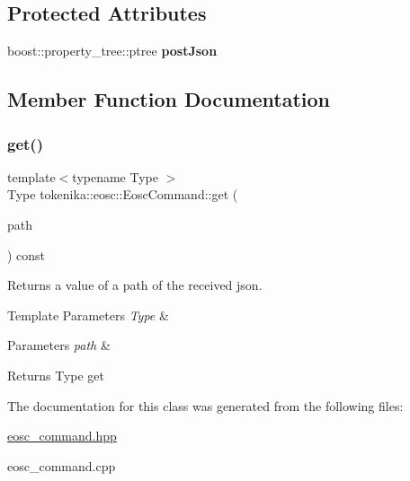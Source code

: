 \subsection*{Protected Attributes}
\begin{DoxyCompactItemize}
\item 
\mbox{\label{classtokenika_1_1eosc_1_1_eosc_command_a1642782c91f4877a8fba395324fb7337}} 
boost\+::property\+\_\+tree\+::ptree {\bfseries post\+Json}
\end{DoxyCompactItemize}


\subsection{Member Function Documentation}
\mbox{\label{classtokenika_1_1eosc_1_1_eosc_command_aa1da6eb23f52159afa4a15e767cd7d6f}} 
\subsubsection{\texorpdfstring{get()}{get()}}
{\footnotesize\ttfamily template$<$typename Type $>$ \\
Type tokenika\+::eosc\+::\+Eosc\+Command\+::get (\begin{DoxyParamCaption}\item[{const boost\+::property\+\_\+tree\+::ptree\+::path\+\_\+type \&}]{path }\end{DoxyParamCaption}) const\hspace{0.3cm}{\ttfamily [inline]}}



Returns a value of a path of the received json. 


\begin{DoxyTemplParams}{Template Parameters}
{\em Type} & \\
\hline
\end{DoxyTemplParams}

\begin{DoxyParams}{Parameters}
{\em path} & \\
\hline
\end{DoxyParams}
\begin{DoxyReturn}{Returns}
Type get 
\end{DoxyReturn}


The documentation for this class was generated from the following files\+:\begin{DoxyCompactItemize}
\item 
\hyperlink{eosc__command_8hpp}{eosc\+\_\+command.\+hpp}\item 
eosc\+\_\+command.\+cpp\end{DoxyCompactItemize}
